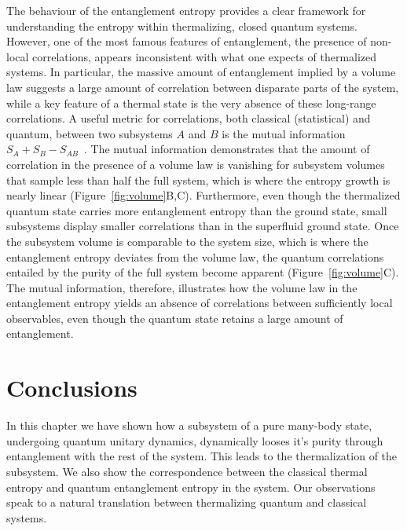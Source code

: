 The behaviour of the entanglement entropy provides a clear framework for understanding the entropy within thermalizing, closed quantum systems. However, one of the most famous features of entanglement, the presence of non-local correlations, appears inconsistent with what one expects of thermalized systems. In particular, the massive amount of entanglement implied by a volume law suggests a large amount of correlation between disparate parts of the system, while a key feature of a thermal state is the very absence of these long-range correlations. A useful metric for correlations, both classical (statistical) and quantum, between two subsystems $A$ and $B$ is the mutual information $S_A +S_B - S_{AB}$~\cite{Wolf2008, Islam2015}. The mutual information demonstrates that the amount of correlation in the presence of a volume law is vanishing for subsystem volumes that sample less than half the full system, which is where the entropy growth is nearly linear (Figure~\ref{fig:volume}B,C). Furthermore, even though the thermalized quantum state carries more entanglement entropy than the ground state, small subsystems display smaller correlations than in the superfluid ground state. Once the subsystem volume is comparable to the system size, which is where the entanglement entropy deviates from the volume law, the quantum correlations entailed by the purity of the full system become apparent (Figure~\ref{fig:volume}C). The mutual information, therefore, illustrates how the volume law in the entanglement entropy yields an absence of correlations between sufficiently local observables, even though the quantum state retains a large amount of entanglement. 

\section{Conclusions}
In this chapter we have shown how a subsystem of a pure many-body state, undergoing quantum unitary dynamics, dynamically looses it's purity through entanglement with the rest of the system. This leads to the thermalization of the subsystem. We also show the correspondence between the classical thermal entropy and quantum entanglement entropy in the system. Our observations speak to a natural translation between thermalizing quantum and classical systems.


